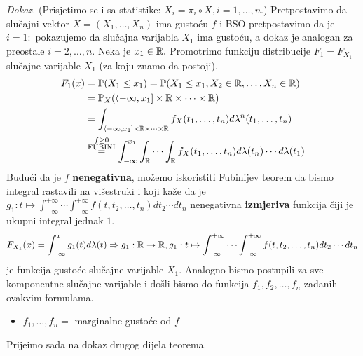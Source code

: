 \documentclass{article}
\begin{document}
\textit{Dokaz.}\newline
(Prisjetimo se i sa statistike: \(X_i=\pi_i\circ X,i=1,\ldots,n.\))\newline
Pretpostavimo da slučajni vektor \(X=(X_1,\ldots,X_n)\) ima gustoću \(f\) i BSO pretpostavimo da je \(i=1:\) pokazujemo da slučajna varijabla \(X_1\) ima gustoću, a dokaz je analogan za preostale \(i=2,\ldots,n.\) Neka je \(x_1\in\Bbb R.\) Promotrimo funkciju distribucije \(F_1=F_{X_1}\) slučajne varijable \(X_1\) (za koju znamo da postoji). \[\begin{aligned}F_1(x)&=\Bbb P(X_1\le x_1)=\Bbb P(X_1\le x_1,X_2\in\Bbb R,\ldots, X_n\in\Bbb R)\\&=\Bbb P_X(\langle-\infty,x_1]\times\Bbb R\times\cdots\times\Bbb R)\\&=\int_{\langle-\infty,x_1]\times\Bbb R\times\cdots\times\Bbb R}f_X(t_1,\ldots,t_n)d\lambda^n(t_1,\ldots,t_n)\\&\overset{\substack{f\ge0\\\text{FUBINI}}}{=}\int_{-\infty}^{x_1}\int_\Bbb R\cdots\int_\Bbb Rf_X(t_1,\ldots,t_n)d\lambda(t_n)\cdots d\lambda(t_1)\end{aligned}\] Budući da je \(f\) \textbf{nenegativna}, možemo iskoristiti Fubinijev teorem da bismo integral rastavili na višestruki i koji kaže da je \(g_1:t\mapsto\int_{-\infty}^{+\infty}\cdots\int_{-\infty}^{+\infty}f(t,t_2,\ldots,t_n)dt_2\cdots dt_n\) nenegativna \textbf{izmjeriva} funkcija čiji je ukupni integral jednak \(1.\)\[F_{X_1}(x)=\int_{-\infty}^xg_1(t)d\lambda(t)\Rightarrow g_1:\Bbb R\to\Bbb R, g_1:t\mapsto\int_{-\infty}^{+\infty}\cdots\int_{-\infty}^{+\infty}f(t,t_2,\ldots,t_n)dt_2\cdots dt_n\] je funkcija gustoće slučajne varijable \(X_1.\) Analogno bismo postupili za sve komponentne slučajne varijable i došli bismo do funkcija \(f_1,f_2,\ldots,f_n\) zadanih ovakvim formulama.\begin{itemize}
    \item[\ding{228}] \(f_1,\ldots,f_n=\) marginalne gustoće od \(f\)
\end{itemize}
Prije\dj{}imo sada na dokaz drugog dijela teorema.
\end{document}
